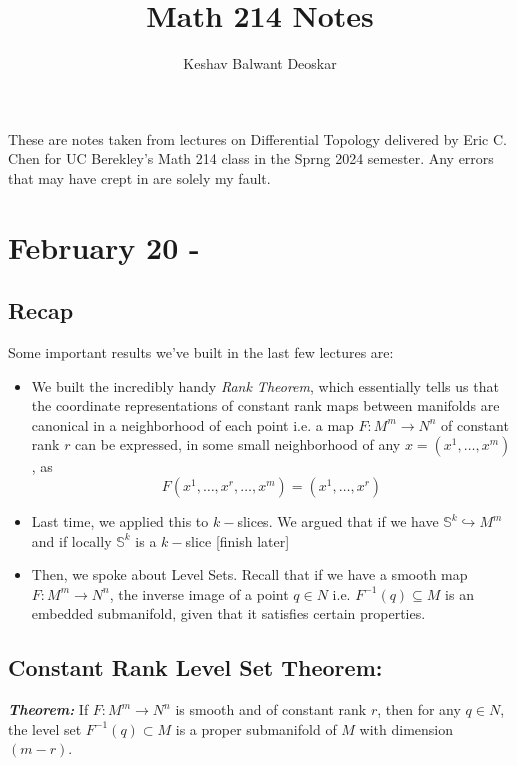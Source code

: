 \documentclass{article}
\title{Math 214 Notes}
\author{Keshav Balwant Deoskar}
\begin{document}
\maketitle

These are notes taken from lectures on Differential Topology delivered by Eric C. Chen for UC Berekley's Math 214 class in the Sprng 2024 semester. Any errors that may have crept in are solely my fault.

\tableofcontents

\pagebreak

\section{February 20 - }

\vskip 1cm
\subsection*{Recap}
Some important results we've built in the last few lectures are:
\begin{itemize}
  \item We built the incredibly handy \emph{Rank Theorem}, which essentially tells us that the coordinate representations of constant rank maps between manifolds are canonical in a neighborhood of each point i.e. a map $F : M^m \rightarrow N^n$ of constant rank $r$ can be expressed, in some small neighborhood of any $x = (x^1, \dots, x^m)$, as 
  \[ F(x^1, \dots, x^r, \dots, x^m) = (x^1, \dots, x^r)  \]
  
  \item Last time, we applied this to $k-$slices. We argued that if we have $\mathbb{S}^k \hookrightarrow M^m$ and if locally $\mathbb{S}^k$ is a $k-$slice [finish later]
  \item Then, we spoke about Level Sets. Recall that if we have a smooth map $F : M^m \rightarrow N^n$, the inverse image of a point $q \in N$ i.e. $F^{-1}(q) \subseteq M$ is an embedded submanifold, given that it satisfies certain properties.
\end{itemize}

\vskip 0.5cm
\subsection{Constant Rank Level Set Theorem:}

\begin{dottedbox}
  \emph{\textbf{Theorem:}} If $F: M^m \rightarrow N^n$ is smooth and of constant rank $r$, then for any $q \in N$, the level set $F^{-1}(q) \subset M$ is a proper submanifold of $M$ with dimension $(m-r)$.
\end{dottedbox}
\end{document}
